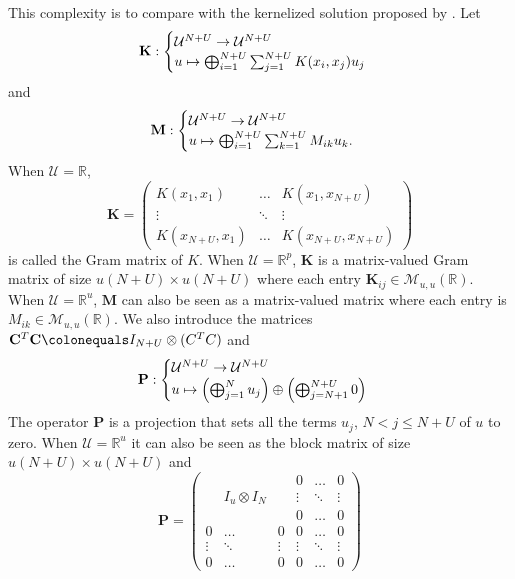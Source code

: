 This complexity is to compare with the kernelized solution proposed by \citet{minh2016unifying}. Let
\begin{dmath*}
\mathbf{K}:\begin{cases}
\mathcal{U}^{N+U} \to \mathcal{U}^{N+U} \\
u\mapsto\Vect_{i=1}^{N+U}\sum_{j=1}^{N+U}K(x_i, x_j)u_j
\end{cases}
\end{dmath*}
and
\begin{dmath*}
\mathbf{M}:\begin{cases}
\mathcal{U}^{N+U} \to \mathcal{U}^{N+U} \\
u\mapsto\Vect_{i=1}^{N+U}\sum_{k=1}^{N+U}M_{ik}u_k.
\end{cases}
\end{dmath*}
When $\mathcal{U}=\mathbb{R}$,
\begin{dmath*}
    \mathbf{K}=\begin{pmatrix} K(x_1, x_1) & \hdots & K(x_1, x_{N+U})
    \\ \vdots & \ddots & \vdots \\  K(x_{N+U}, x_1) & \hdots & K(x_{N+U}, x_{N+U}) \end{pmatrix}
\end{dmath*}
is called the Gram matrix of $K$. When $\mathcal{U}=\mathbb{R}^p$, $\mathbf{K}$ is a matrix-valued Gram matrix of size $u(N+U)\times u(N+U)$ where each entry $\mathbf{K}_{ij}\in\mathcal{M}_{u,u}(\mathbb{R})$. When $\mathcal{U}=\mathbb{R}^u$, $\mathbf{M}$ can also be seen as a matrix-valued matrix where each entry is $M_{ik}\in\mathcal{M}_{u,u}(\mathbb{R})$. We also introduce the matrices $\mathbf{C}^T \mathbf{C}\colonequals I_{N+U} \otimes (C^T C)$ and
\begin{dmath*}
\mathbf{P}:\begin{cases}
\mathcal{U}^{N+U} \to \mathcal{U}^{N+U} \\
u\mapsto \left(\Vect_{j=1}^Nu_j\right) \oplus \left(\Vect_{j=N+1}^{N+U}0\right)
\end{cases}
\end{dmath*}
The operator $\mathbf{P}$ is a projection that sets all the terms $u_j$, $N < j \le N + U$ of $u$ to zero. When $\mathcal{U}=\mathbb{R}^u$ it can also be seen as the block matrix of size $u(N+U) \times u(N + U)$ and
\begin{dmath*}
    \mathbf{P}=\begin{pmatrix}  & & & 0 & \hdots & 0 \\ & I_u \otimes I_{N} & & \vdots & \ddots & \vdots \\ & & & 0 & \hdots & 0 \\
    0 & \hdots & 0 & 0 & \hdots & 0 \\
    \vdots & \ddots & \vdots & \vdots & \ddots & \vdots \\
    0 & \hdots & 0 & 0 & \hdots & 0
    \end{pmatrix}
\end{dmath*}
